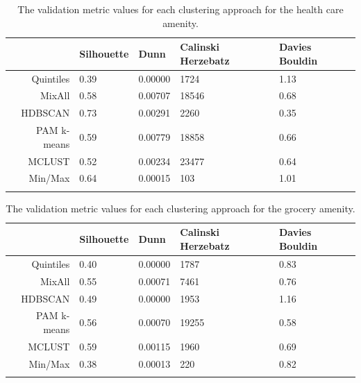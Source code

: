 \documentclass[11pt, a4paper]{article}
\begin{document}
\centering
\begin{longtable}[H]{|r|llll|}
  \hline
 & Silhouette & Dunn & Calinski Herzebatz & Davies Bouldin \\ 
  \hline
Quintiles & 0.39 & 0.00000 &  1724 & 1.13 \\ 
   \hline
MixAll & 0.58 & 0.00707 & 18546 & 0.68 \\ 
   \hline
HDBSCAN & 0.73 & 0.00291 &  2260 & 0.35 \\ 
   \hline
PAM k-means & 0.59 & 0.00779 & 18858 & 0.66 \\ 
   \hline
MCLUST & 0.52 & 0.00234 & 23477 & 0.64 \\ 
   \hline
Min/Max & 0.64 & 0.00015 &   103 & 1.01 \\ 
   \hline
\caption[Health care validation metrics]{The validation metric values for each clustering approach for the health care amenity.}\label{healthcarevalid}
\end{longtable}









\centering
\begin{longtable}[H]{|r|llll|}
  \hline
 & Silhouette & Dunn & Calinski Herzebatz & Davies Bouldin \\ 
  \hline
Quintiles & 0.40 & 0.00000 &  1787 & 0.83 \\ 
   \hline
MixAll & 0.55 & 0.00071 &  7461 & 0.76 \\ 
   \hline
HDBSCAN & 0.49 & 0.00000 &  1953 & 1.16 \\ 
   \hline
PAM k-means & 0.56 & 0.00070 & 19255 & 0.58 \\ 
   \hline
MCLUST & 0.59 & 0.00115 &  1960 & 0.69 \\ 
   \hline
Min/Max & 0.38 & 0.00013 &   220 & 0.82 \\ 
   \hline
\caption[Grocery validation metrics]{The validation metric values for each clustering approach for the grocery amenity.}\label{groceryvalid}
\end{longtable}
\end{document}
